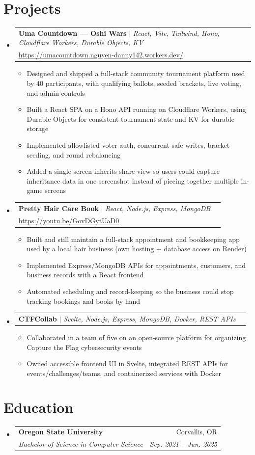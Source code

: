 \documentclass[letterpaper,11pt]{article}
\makeatletter
\newcommand{\resumeItem}[1]{%
  \item\small{%
    {#1 \vspace{-2pt}}%
  }%
}
\newcommand{\resumeSubheading}[4]{%
  \vspace{-2pt}\item%
    \begin{tabular*}{0.97\textwidth}[t]{l@{\extracolsep{\fill}}r}%
      \textbf{#1} & #2 \\%
      \textit{\small#3} & \textit{\small #4} \\%
    \end{tabular*}\vspace{-7pt}%
}
\newcommand{\resumeProjectHeading}[2]{%
    \item%
    \begin{tabular*}{0.97\textwidth}{l@{\extracolsep{\fill}}r}%
      \small#1 & #2 \\%
    \end{tabular*}\vspace{-7pt}%
}
\newcommand{\resumeSubHeadingListStart}{\begin{itemize}[leftmargin=0.15in, label={}]}
\newcommand{\resumeSubHeadingListEnd}{\end{itemize}}
\newcommand{\resumeItemListStart}{\begin{itemize}[leftmargin=0.2in, itemsep=4pt, topsep=4pt, parsep=0pt]}
\newcommand{\resumeItemListEnd}{\end{itemize}\vspace{-2pt}}
\makeatother
\begin{document}
\section{Projects}
  \resumeSubHeadingListStart
    \resumeProjectHeading
      {\textbf{Uma Countdown --- Oshi Wars} $|$ \emph{React, Vite, Tailwind, Hono, Cloudflare Workers, Durable Objects, KV} \\
      \href{https://umacountdown.nguyen-danny142.workers.dev/}{\underline{https://umacountdown.nguyen-danny142.workers.dev/}}}{}
      \resumeItemListStart
        \resumeItem{Designed and shipped a full-stack community tournament platform used by 40 participants, with qualifying ballots, seeded brackets, live voting, and admin controls}
        \resumeItem{Built a React SPA on a Hono API running on Cloudflare Workers, using Durable Objects for consistent tournament state and KV for durable storage}
        \resumeItem{Implemented allowlisted voter auth, concurrent-safe writes, bracket seeding, and round rebalancing}
        \resumeItem{Added a single-screen inherits share view so users could capture inheritance data in one screenshot instead of piecing together multiple in-game screens}
      \resumeItemListEnd
    \resumeProjectHeading
      {\textbf{Pretty Hair Care Book} $|$ \emph{React, Node.js, Express, MongoDB} \\
      \href{https://youtu.be/GovDGytUaD0}{\underline{https://youtu.be/GovDGytUaD0}}}{}
      \resumeItemListStart
        \resumeItem{Built and still maintain a full-stack appointment and bookkeeping app used by a local hair business (own hosting + database access on Render)}
        \resumeItem{Implemented Express/MongoDB APIs for appointments, customers, and business records with a React frontend}
        \resumeItem{Automated scheduling and record-keeping so the business could stop tracking bookings and books by hand}
      \resumeItemListEnd
    \resumeProjectHeading
      {\textbf{CTFCollab} $|$ \emph{Svelte, Node.js, Express, MongoDB, Docker, REST APIs}}{}
      \resumeItemListStart
        \resumeItem{Collaborated in a team of five on an open-source platform for organizing Capture the Flag cybersecurity events}
        \resumeItem{Owned accessible frontend UI in Svelte, integrated REST APIs for events/challenges/teams, and containerized services with Docker}
      \resumeItemListEnd
  \resumeSubHeadingListEnd

\section{Education}
  \resumeSubHeadingListStart
    \resumeSubheading
      {Oregon State University}{Corvallis, OR}
      {Bachelor of Science in Computer Science}{Sep. 2021 -- Jun. 2025}
  \resumeSubHeadingListEnd
\end{document}
